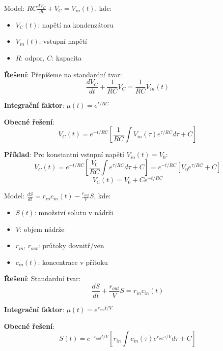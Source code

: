\vspace{0.6\baselineskip}

\begin{application}
Model: $RC\frac{dV_C}{dt} + V_C = V_{in}(t)$, kde:
\begin{itemize}
\item $V_C(t)$: napětí na kondenzátoru
\item $V_{in}(t)$: vstupní napětí
\item $R$: odpor, $C$: kapacita
\end{itemize}

\textbf{Řešení}: Přepíšeme na standardní tvar:
\[
\frac{dV_C}{dt} + \frac{1}{RC}V_C = \frac{1}{RC}V_{in}(t)
\]

\textbf{Integrační faktor}: $\mu(t) = e^{t/RC}$

\textbf{Obecné řešení}:
\[
V_C(t) = e^{-t/RC}\left[\frac{1}{RC}\int V_{in}(\tau)e^{\tau/RC}d\tau + C\right]
\]

\textbf{Příklad}: Pro konstantní vstupní napětí $V_{in}(t) = V_0$:
\[
V_C(t) = e^{-t/RC}\left[\frac{V_0}{RC}\int e^{\tau/RC}d\tau + C\right] = e^{-t/RC}\left[V_0 e^{\tau/RC} + C\right]
\]
\[
V_C(t) = V_0 + Ce^{-t/RC}
\]
\end{application}

\vspace{0.6\baselineskip}

\begin{application}
Model: $\frac{dS}{dt} = r_{in}c_{in}(t) - \frac{r_{out}}{V}S$, kde:
\begin{itemize}
\item $S(t)$: množství solutu v nádrži
\item $V$: objem nádrže
\item $r_{in}$, $r_{out}$: průtoky dovnitř/ven
\item $c_{in}(t)$: koncentrace v přítoku
\end{itemize}

\textbf{Řešení}: Standardní tvar:
\[
\frac{dS}{dt} + \frac{r_{out}}{V}S = r_{in}c_{in}(t)
\]

\textbf{Integrační faktor}: $\mu(t) = e^{r_{out}t/V}$

\textbf{Obecné řešení}:
\[
S(t) = e^{-r_{out}t/V}\left[r_{in}\int c_{in}(\tau)e^{r_{out}\tau/V}d\tau + C\right]
\]
\end{application}

\vspace{0.8\baselineskip}

